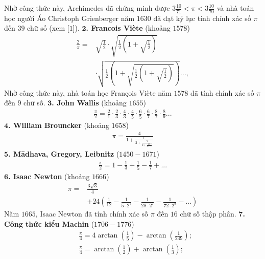 \begin{multicols}{2}
	\vskip 0.1cm
	Nhờ công thức này, Archimedes đã chứng minh được $3\frac{10}{71} < \pi < 3\frac{10}{70}$ và nhà toán học người Áo Christoph Grienberger năm $1630$ đã đạt kỷ lục tính chính xác  số $\pi$  đến $39$ chữ số (xem [$1$]).
	\vskip 0.1cm
	$\pmb2$\textbf{\color{lichsutoanhoc}. Francois Viète} (khoảng $1578$)
	\begin{align*}
		\frac{2}{\pi } =& \sqrt {\frac{1}{2}}  \cdot \sqrt {\frac{1}{2}\left( {1 + \sqrt {\frac{1}{2}} } \right)}  \\
		&\cdot \sqrt {\frac{1}{2}\left( {1 + \sqrt {\frac{1}{2}\left( {1 + \sqrt {\frac{1}{2}} } \right)} } \right)} ...,
	\end{align*}
	Nhờ công thức này, nhà toán học François Viète năm $1578$ đã tính chính xác số $\pi$  đến $9$ chữ số.
	\vskip 0.1cm
	$\pmb3$\textbf{\color{lichsutoanhoc}. John Wallis} (khoảng $1655$)
	\begin{align*}
		\frac{\pi }{2} = \frac{2}{1} \cdot \frac{2}{3} \cdot \frac{4}{3} \cdot \frac{4}{5} \cdot \frac{6}{5} \cdot \frac{6}{7} \cdot \frac{8}{7} \cdot \frac{8}{9}...
	\end{align*}
	$\pmb4$\textbf{\color{lichsutoanhoc}. William Brouncker} (khoảng $1658$)
	\begin{align*}
		\pi  = \frac{4}{{1 + \frac{1}{{2 + \frac{9}{{2 + \frac{{25}}{{2 + ...}}}}}}}}
	\end{align*}
	$\pmb5$\textbf{\color{lichsutoanhoc}. Mādhava, Gregory, Leibnitz} ($1450-1671$)
	\begin{align*}
		\frac{\pi }{2} = 1 - \frac{1}{3} + \frac{1}{5} - \frac{1}{7} + ...
	\end{align*}
	$\pmb6$\textbf{\color{lichsutoanhoc}. Isaac Newton} (khoảng $1666$)
	\begin{align*}
		\pi  =& \frac{{3\sqrt 3 }}{4} \\
		&+\! 24\left(\!\! {\frac{1}{{12}} \!-\! \frac{1}{{5 \!\cdot\! {2^5}}} \!-\! \frac{1}{{28 \!\cdot\! {2^7}}} \!-\! \frac{1}{{72 \!\cdot\! {2^9}}} \!-\! ...}\! \right)
	\end{align*}
	Năm $1665$, Isaac Newton đã tính chính xác số $\pi$ đến $16$ chữ số thập phân.
	\vskip 0.1cm
	$\pmb7$\textbf{\color{lichsutoanhoc}. Công thức kiểu Machin} ($1706-1776$)
	\begin{align*}
		&\frac{\pi }{4} = 4\arctan \left( {\frac{1}{5}} \right) - \arctan \left( {\frac{1}{{239}}} \right);\\
		&\frac{\pi }{4} = \arctan \left( {\frac{1}{2}} \right) + \arctan \left( {\frac{1}{3}} \right);\\

\end{align*}
\end{multicols}
